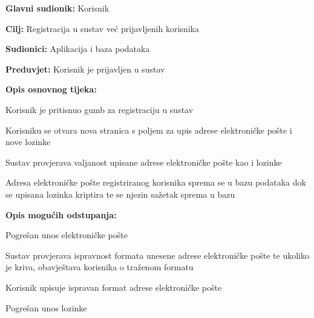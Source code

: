 				\noindent {}
				\begin{packed_item}

					\item \textbf{Glavni sudionik: }Korisnik
					\item  \textbf{Cilj:} Registracija u sustav već prijavljenih korisnika
					\item  \textbf{Sudionici:} Aplikacija i baza podataka
					\item  \textbf{Preduvjet:} Korisnik je prijavljen u sustav
					\item  \textbf{Opis osnovnog tijeka:}

					\item[] \begin{packed_enum}

						\item Korisnik je pritisnuo gumb za registraciju u sustav
						\item Korisniku se otvara nova stranica s poljem za upis adrese elektroničke pošte i nove lozinke
						\item Sustav provjerava valjanost upisane adrese elektroničke pošte kao i lozinke
						\item Adresa elektroničke pošte registriranog korisnika sprema se u bazu podataka dok se upisana lozinka kriptira te se njezin sažetak sprema u bazu

					\end{packed_enum}

					\item  \textbf{Opis mogućih odstupanja:}

					\item[] \begin{packed_item}

						\item[3.a] Pogrešan unos elektroničke pošte
						\item[] \begin{packed_enum}

							\item Sustav provjerava ispravnost formata unesene adrese elektroničke pošte te ukoliko je kriva, obavještava korisnika o traženom formatu
							\item Korisnik upisuje ispravan format adrese elektroničke pošte

						\end{packed_enum}
						\item[3.b] Pogrešan unos lozinke
						\item[] \begin{packed_enum}


\end{packed_enum}
\end{packed_item}
\end{packed_item}
